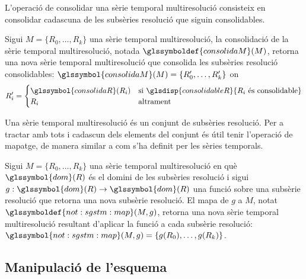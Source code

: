 L'operació de consolidar una sèrie temporal multiresolució consisteix
en consolidar cadascuna de les subsèries resolució que siguin
consolidables.
\begin{definition}
  Sigui $M=\{R_0,\dotsc,R_k\}$ una sèrie temporal multiresolució, la
  consolidació de la sèrie temporal multiresolució, notada
  $\glssymboldef{consolidaM}(M)$, retorna una nova sèrie temporal
  multiresolució que consolida les subsèries resolució consolidables:
  $\glssymbol{consolidaM}(M) =\{R_0',\dotsc,R_k'\}$ on
  \[
  R_i' = 
  \begin{cases}
    \glssymbol{consolidaR}(R_i) & \text{si }
    \glsdisp{consolidableR}{R_i \text{ és
        consolidable}}\\
    R_i & \text{altrament}
  \end{cases}
  \]
\end{definition}



Una sèrie temporal multiresolució és un conjunt de subsèries
resolució. Per a tractar amb tots i cadascun dels elements del conjunt
és útil tenir l'operació de mapatge, de manera similar a com s'ha
definit per les sèries temporals.
 \begin{definition}
   \label{def:sgstm:mapa}
   Sigui $M=\{R_0,\dotsc,R_k\}$ una sèrie temporal multiresolució en
   què $\glssymbol{dom}(R)$ és el domini de les subsèries resolució i
   sigui $g: \glssymbol{dom}(R) \rightarrow \glssymbol{dom}(R)$ una
   funció sobre una subsèrie resolució que retorna una nova subsèrie
   resolució.
   El mapa de $g$ a $M$, notat $\glssymboldef{not:sgstm:map}(M,g)$,
   retorna una nova sèrie temporal multiresolució resultant d'aplicar
   la funció a cada subsèrie resolució:
   $\glssymbol{not:sgstm:map}(M,g) = \{ g(R_0), \dotsc, g(R_k) \}$.
\end{definition}








\subsection{Manipulació de l'esquema}
\label{sec:model:sgstm-manipulacio-esquema}


